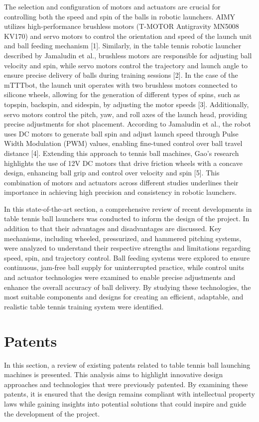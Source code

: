 \documentclass[12pt]{report}
\begin{document}
The selection and configuration of motors and actuators are crucial for controlling both the speed and spin of the balls in robotic launchers. AIMY utilizes high-performance brushless motors (T-MOTOR Antigravity MN5008 KV170) and servo motors to control the orientation and speed of the launch unit and ball feeding mechanism [1]. Similarly, in the table tennis robotic launcher described by Jamaludin et al., brushless motors are responsible for adjusting ball velocity and spin, while servo motors control the trajectory and launch angle to ensure precise delivery of balls during training sessions [2]. In the case of the mTTTbot, the launch unit operates with two brushless motors connected to silicone wheels, allowing for the generation of different types of spins, such as topspin, backspin, and sidespin, by adjusting the motor speeds [3]. Additionally, servo motors control the pitch, yaw, and roll axes of the launch head, providing precise adjustments for shot placement. According to Jamaludin et al., the robot uses DC motors to generate ball spin and adjust launch speed through Pulse Width Modulation (PWM) values, enabling fine-tuned control over ball travel distance [4]. Extending this approach to tennis ball machines, Gao’s research highlights the use of 12V DC motors that drive friction wheels with a concave design, enhancing ball grip and control over velocity and spin [5]. This combination of motors and actuators across different studies underlines their importance in achieving high precision and consistency in robotic launchers.



\vspace{1cm}In this state-of-the-art section, a comprehensive review of recent developments in table tennis ball launchers was conducted to inform the design of the project. In addition to that their advantages and disadvantages are discussed. Key mechanisms, including wheeled, pressurized, and hammered pitching systems, were analyzed to understand their respective strengths and limitations regarding speed, spin, and trajectory control. Ball feeding systems were explored to ensure continuous, jam-free ball supply for uninterrupted practice, while control units and actuator technologies were examined to enable precise adjustments and enhance the overall accuracy of ball delivery.  By studying these technologies, the most suitable components and designs for creating an efficient, adaptable, and realistic table tennis training system were identified. 

 
\section{Patents}
In this section, a review of existing patents related to table tennis ball launching machines is presented. This analysis aims to highlight innovative design approaches and technologies that were previously patented. By examining these patents, it is ensured that the design remains compliant with intellectual property laws while gaining insights into potential solutions that could inspire and guide the development of the project.
\end{document}
